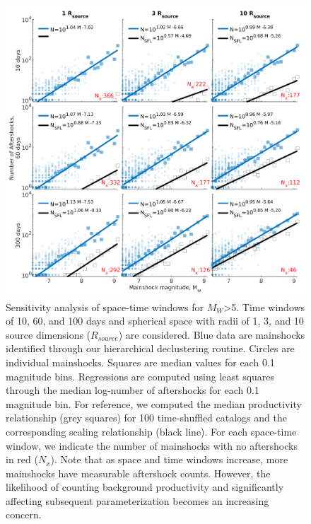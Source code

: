 \documentclass[draft]{agujournal}
\begin{document}
\begin{figure}
\centering
\includegraphics{figures/sensitivity_mw5.png}
\caption{Sensitivity analysis of space-time windows for $M_W$>5. Time windows of 10, 60, and 100 days and spherical space with radii of 1, 3, and 10 source dimensions ($R_{source}$) are considered. Blue data are mainshocks identified through our hierarchical declustering routine. Circles are individual mainshocks. Squares are median values for each 0.1 magnitude bins. Regressions are computed using least squares through the median log-number of aftershocks for each 0.1 magnitude bin. For reference, we computed the median productivity relationship (grey squares) for 100 time-shuffled catalogs and the corresponding scaling relationship (black line). For each space-time window, we indicate the number of mainshocks with no aftershocks in red ($N_x$). Note that as space and time windows increase, more mainshocks have measurable aftershock counts. However, the likelihood of counting background productivity and significantly affecting subsequent parameterization becomes an increasing concern.}
\label{fig:sensitivity}
\end{figure} 
\end{document}
